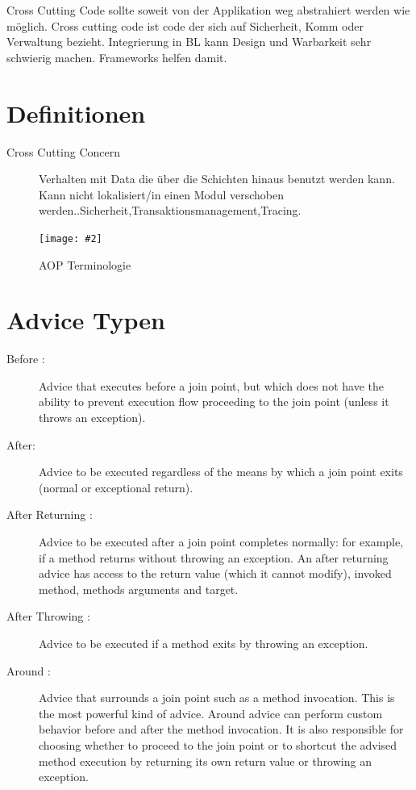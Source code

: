 \documentclass[a4paper,10pt]{scrreprt}
\newcommand{\pic}[2][figure]{\begin{figure}[h]
 \centering
 \texttt{[image: \#2]}
 \caption{#1}
\end{figure}
}
\begin{document}
\begin{framed}
 Cross Cutting Code sollte soweit von der Applikation weg abstrahiert werden wie möglich.
 Cross cutting code ist code der sich auf Sicherheit, Komm oder Verwaltung bezieht. Integrierung in BL kann Design und 
Warbarkeit sehr schwierig machen. Frameworks helfen damit.
\end{framed}
\section{Definitionen}
\begin{description}
 \item [Cross Cutting Concern] Verhalten mit Data die über die Schichten hinaus benutzt werden kann. Kann nicht 
lokalisiert/in einen Modul verschoben werden..Sicherheit,Transaktionsmanagement,Tracing.
\end{description}

\pic[AOP Terminologie]{aopterm.png}

\section{Advice Typen}
\begin{description}
\item[Before :] Advice that executes before a join point, but which does not have
the ability to prevent execution flow proceeding to the join point (unless it
throws an exception).
\item [After:] Advice to be executed regardless of the means by which a join point
exits (normal or exceptional return).
\item[After Returning :] Advice to be executed after a join point completes
normally: for example, if a method returns without throwing an exception. An
after returning advice has access to the return value (which it cannot modify),
invoked method, methods arguments and target.
\item[After Throwing :] Advice to be executed if a method exits by throwing an
exception.
\item[Around :] Advice that surrounds a join point such as a method invocation.
This is the most powerful kind of advice. Around advice can perform custom
behavior before and after the method invocation. It is also responsible for
choosing whether to proceed to the join point or to shortcut the advised
method execution by returning its own return value or throwing an exception.
\end{description}
\end{document}
